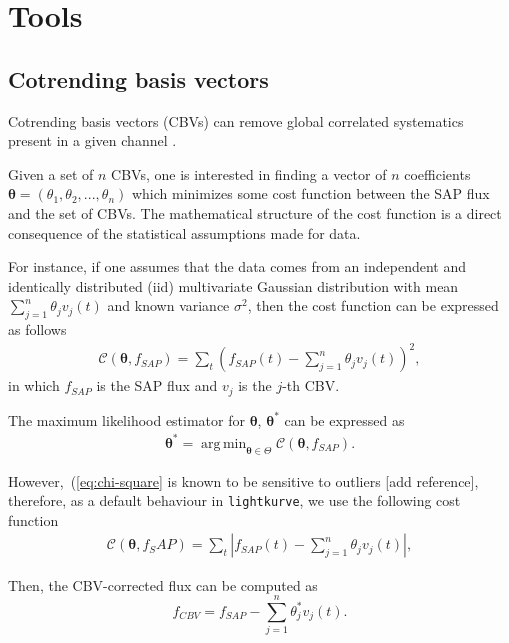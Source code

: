 \documentclass{article}
\DeclareMathOperator*{\argmin}{arg\,min}
\begin{document}
\section{Tools}

\subsection{Cotrending basis vectors}

Cotrending basis vectors (CBVs) can remove global correlated
systematics present in a given channel \cite{2012PASP..124.1000S}.

Given a set of $n$ CBVs, one is interested in finding a vector of $n$
coefficients $\bm{\theta}=(\theta_1, \theta_2, ..., \theta_n)$ which minimizes
some cost function between the SAP flux and the set of CBVs. The mathematical
structure of the cost function is a direct consequence of the statistical
assumptions made for data.

For instance, if one assumes that the data comes from an independent and
identically distributed (iid) multivariate Gaussian distribution with mean
$\sum_{j=1}^{n}\theta_j v_{j}(t)$ and known variance $\sigma^2$, then the
cost function can be expressed as follows
\begin{align}
    \mathcal{C}(\bm{\theta}, f_{SAP}) = \sum_{t}\left(f_{SAP}(t)
    - \sum_{j=1}^{n}\theta_j v_{j}(t)\right)^2,
\label{eq:chi-square}
\end{align}
in which $f_{SAP}$ is the SAP flux and $v_j$ is the $j$-th CBV.

The maximum likelihood estimator for $\bm{\theta}$, $\bm{\theta^{*}}$ can be
expressed as
\begin{align}
    \bm{\theta}^{*} = \argmin_{\bm{\theta} \in \Theta}
    \mathcal{C}(\bm{\theta}, f_{SAP}).
\end{align}

However,~(\ref{eq:chi-square} is known to be sensitive to outliers [add reference],
therefore, as a default behaviour in \texttt{lightkurve}, we use the following cost
function
\begin{align}
    \mathcal{C}(\bm{\theta}, f_SAP) = \sum_{t} \left\rvert f_{SAP}(t)
    - \sum_{j=1}^{n}\theta_j v_{j}(t)\right\rvert,
\label{eq:l1-norm}
\end{align}


Then, the CBV-corrected flux can be computed as
\begin{equation}
    f_{CBV} = f_{SAP} - \sum_{j=1}^{n}\theta^{*}_j v_{j}(t).
\end{equation}
\end{document}
